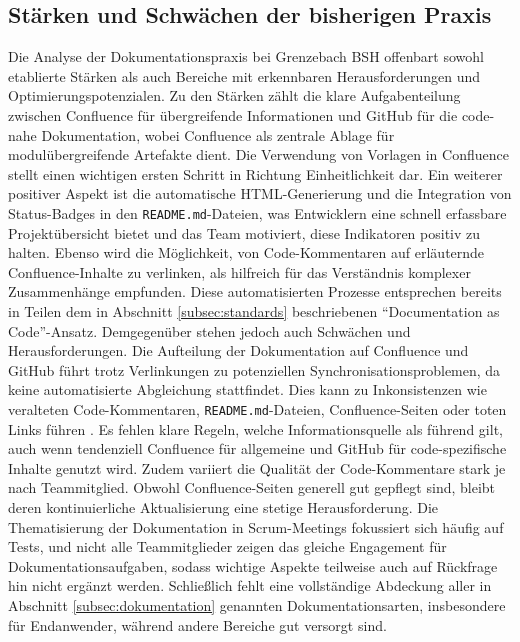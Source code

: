\documentclass[12pt,oneside]{article}
\begin{document}
    \subsection{Stärken und Schwächen der bisherigen Praxis}
    \label{subsec:ss_dok}
    Die Analyse der Dokumentationspraxis bei Grenzebach BSH offenbart sowohl etablierte Stärken als auch Bereiche mit erkennbaren Herausforderungen und Optimierungspotenzialen.
    \newline
    Zu den Stärken zählt die klare Aufgabenteilung zwischen Confluence für übergreifende Informationen und GitHub für die code-nahe Dokumentation, wobei Confluence als zentrale Ablage für modulübergreifende Artefakte dient. Die Verwendung von Vorlagen in Confluence stellt einen wichtigen ersten Schritt in Richtung Einheitlichkeit dar. Ein weiterer positiver Aspekt ist die automatische HTML-Generierung und die Integration von Status-Badges in den \texttt{README.md}-Dateien, was Entwicklern eine schnell erfassbare Projektübersicht bietet und das Team motiviert, diese Indikatoren positiv zu halten. Ebenso wird die Möglichkeit, von Code-Kommentaren auf erläuternde Confluence-Inhalte zu verlinken, als hilfreich für das Verständnis komplexer Zusammenhänge empfunden. Diese automatisierten Prozesse entsprechen bereits in Teilen dem in Abschnitt \ref{subsec:standards} beschriebenen ``Documentation as Code''-Ansatz.
    \newline
    Demgegenüber stehen jedoch auch Schwächen und Herausforderungen. Die Aufteilung der Dokumentation auf Confluence und GitHub führt trotz Verlinkungen zu potenziellen Synchronisationsproblemen, da keine automatisierte Abgleichung stattfindet. Dies kann zu Inkonsistenzen wie veralteten Code-Kommentaren, \texttt{README.md}-Dateien, Confluence-Seiten oder toten Links führen \cite{webmakers2024}. Es fehlen klare Regeln, welche Informationsquelle als führend gilt, auch wenn tendenziell Confluence für allgemeine und GitHub für code-spezifische Inhalte genutzt wird. Zudem variiert die Qualität der Code-Kommentare stark je nach Teammitglied. Obwohl Confluence-Seiten generell gut gepflegt sind, bleibt deren kontinuierliche Aktualisierung eine stetige Herausforderung. Die Thematisierung der Dokumentation in Scrum-Meetings fokussiert sich häufig auf Tests, und nicht alle Teammitglieder zeigen das gleiche Engagement für Dokumentationsaufgaben, sodass wichtige Aspekte teilweise auch auf Rückfrage hin nicht ergänzt werden. Schließlich fehlt eine vollständige Abdeckung aller in Abschnitt \ref{subsec:dokumentation} genannten Dokumentationsarten, insbesondere für Endanwender, während andere Bereiche gut versorgt sind.
\end{document}
